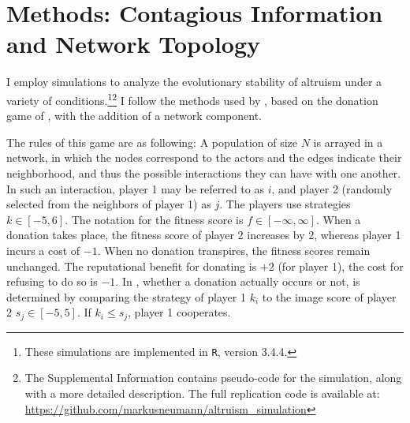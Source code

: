 \documentclass[12pt]{article}
\begin{document}

\section*{Methods: Contagious Information and Network Topology}
I employ simulations to analyze the evolutionary stability of altruism under a variety of conditions.\footnote{These simulations are implemented in \texttt{R}, version 3.4.4.}\footnote{The Supplemental Information contains pseudo-code for the simulation, along with a more detailed description. The full replication code is available at: \url{https://github.com/markusneumann/altruism_simulation}} I follow the methods used by \cite{Peleteiro2014}, based on the donation game of \cite{Nowak1998}, with the addition of a network component.

The rules of this game are as following: A population of size $N$ is arrayed in a network, in which the nodes correspond to the actors and the edges indicate their neighborhood, and thus the possible interactions they can have with one another. In such an interaction, player 1 may be referred to as $i$, and player 2 (randomly selected from the neighbors of player 1) as $j$. The players use strategies $k \in [-5,6]$. The notation for the fitness score is $f \in [-\infty,\infty]$. When a donation takes place, the fitness score of player 2 increases by 2, whereas player 1 incurs a cost of $-1$. When no donation transpires, the fitness scores remain unchanged. The reputational benefit for donating is $+2$ (for player 1), the cost for refusing to do so is $-1$. In \cite{Peleteiro2014}, whether a donation actually occurs or not, is determined by comparing the strategy of player 1 $k_i$ to the image score of player 2 $s_j \in [-5,5]$. If $k_i\leq s_j$, player 1 cooperates.
\end{document}
